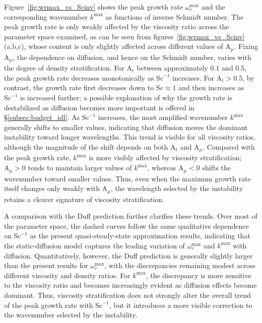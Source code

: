 \documentclass[11pt]{article}
\newcommand{\Atw}{\mathrm{A_t}}
\newcommand{\Sch}{\mathrm{Sc}}
\newcommand{\Amu}{\mathrm{A}_{\mu}}
\begin{document}
Figure~\ref{fig:wrmax_vs_Scinv} shows the peak growth rate \(\omega_r^{\max}\) and the corresponding wavenumber \(k^{\max}\) as functions of inverse Schmidt number. The peak growth rate is only weakly affected by the viscosity ratio across the parameter space examined, as can be seen from figures~\ref{fig:wrmax_vs_Scinv}(a,b,c), whose content is only slightly affected across different values of \(\Amu\). Fixing \(\Amu\), the dependence on diffusion, and hence on the Schmidt number, varies with the degree of density stratification. For \(\Atw\) between approximately \(0.1\) and \(0.5\), the peak growth rate decreases monotonically as \(\Sch^{-1}\) increases. For \(\Atw > 0.5\), by contrast, the growth rate first decreases down to \(\Sch \approx 1\) and then increases as \(\Sch^{-1}\) is increased further; a possible explanation of why the growth rate is destabilized as diffusion becomes more important is offered in \S\ref{subsec:budget_idl}. As \(\Sch^{-1}\) increases, the most amplified wavenumber \(k^{\max}\) generally shifts to smaller values, indicating that diffusion moves the dominant instability toward longer wavelengths. This trend is visible for all viscosity ratios, although the magnitude of the shift depends on both \(\Atw\) and \(\Amu\). Compared with the peak growth rate, \(k^{\max}\) is more visibly affected by viscosity stratification; \(\Amu > 0\) tends to maintain larger values of \(k^{\max}\), whereas \(\Amu < 0\) shifts the wavenumber toward smaller values. Thus, even when the maximum growth rate itself changes only weakly with \(\Amu\), the wavelength selected by the instability retains a clearer signature of viscosity stratification.

A comparison with the Duff prediction further clarifies these trends. Over most of the parameter space, the dashed curves follow the same qualitative dependence on \(\Sch^{-1}\) as the present quasi-steady-state approximation results, indicating that the static-diffusion model captures the leading variation of \(\omega_r^{\max}\) and \(k^{\max}\) with diffusion. Quantitatively, however, the Duff prediction is generally slightly larger than the present results for \(\omega_r^{\max}\), with the discrepancies remaining modest across different viscosity and density ratios. For \(k^{\max}\), the discrepancy is more sensitive to the viscosity ratio and becomes increasingly evident as diffusion effects become dominant. Thus, viscosity stratification does not strongly alter the overall trend of the peak growth rate with \(\Sch^{-1}\), but it introduces a more visible correction to the wavenumber selected by the instability.
\end{document}
